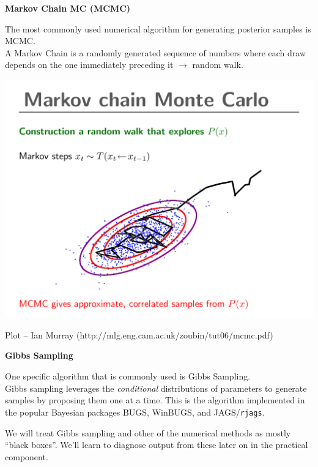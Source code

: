 \documentclass[12pt,xcolor=svgnames]{beamer}
\newcommand{\bl}{\color{blue}}
\newcommand{\theme}{\color{FireBrick}}
\newcommand{\sk}{\vspace{.4cm}}
\newcommand{\chap}[1]{{\theme \Large \bf #1} \sk}
\begin{document}
\begin{frame}
\chap{Markov Chain MC (MCMC)}

The most commonly used numerical algorithm for generating posterior samples is MCMC. \\

\sk
A {\bl Markov Chain} is a randomly generated sequence of numbers where each draw depends on the one immediately preceding it $\rightarrow$ random walk.


\begin{center}
\hspace{2.75cm} \includegraphics[scale=0.375,trim=30 80 0 70]{MCMC}
\end{center}

\vfill
\hfill {\tiny Plot -- Ian Murray (http://mlg.eng.cam.ac.uk/zoubin/tut06/mcmc.pdf)} 
\end{frame}

\begin{frame}
\chap{Gibbs Sampling}

One specific algorithm that is commonly used is {\bl Gibbs Sampling}. \\

\sk
Gibbs sampling leverages the {\em conditional} distributions of parameters to generate samples by proposing them one at a time. This is the algorithm implemented in the popular Bayesian packages {\sf BUGS}, {\sf WinBUGS}, and {\sf JAGS}/{\tt rjags}. 

\sk 
We will treat Gibbs sampling and other of the numerical methods as mostly ``black boxes''. We'll learn to diagnose output from these later on in the practical component.


\end{frame}
\end{document}
